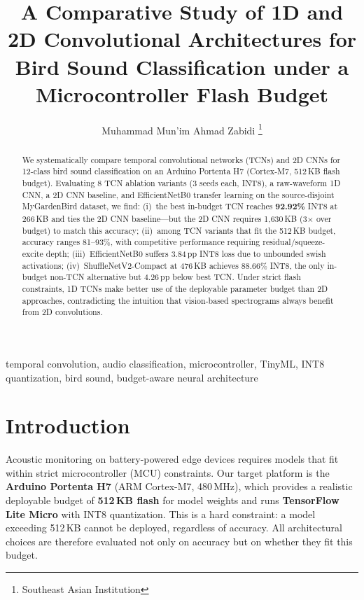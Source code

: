 \documentclass[conference]{IEEEtran}
\begin{document}
\title{A Comparative Study of 1D and 2D Convolutional Architectures for Bird Sound Classification under a Microcontroller Flash Budget}

\author{Muhammad Mun'im Ahmad Zabidi%
\thanks{Southeast Asian Institution}}

\maketitle

\begin{abstract}
We systematically compare temporal convolutional networks (TCNs) and 2D CNNs for 12-class bird sound classification on an Arduino Portenta H7 (Cortex-M7, 512\,KB flash budget). Evaluating 8 TCN ablation variants (3 seeds each, INT8), a raw-waveform 1D CNN, a 2D CNN baseline, and EfficientNetB0 transfer learning on the source-disjoint MyGardenBird dataset, we find: (i)~the best in-budget TCN reaches \textbf{92.92\%} INT8 at 266\,KB and ties the 2D CNN baseline---but the 2D CNN requires 1{,}630\,KB (3$\times$ over budget) to match this accuracy; (ii)~among TCN variants that fit the 512\,KB budget, accuracy ranges 81--93\%, with competitive performance requiring residual/squeeze-excite depth; (iii)~EfficientNetB0 suffers 3.84\,pp INT8 loss due to unbounded swish activations; (iv)~ShuffleNetV2-Compact at 476\,KB achieves 88.66\% INT8, the only in-budget non-TCN alternative but 4.26\,pp below best TCN. Under strict flash constraints, 1D TCNs make better use of the deployable parameter budget than 2D approaches, contradicting the intuition that vision-based spectrograms always benefit from 2D convolutions.
\end{abstract}

\begin{IEEEkeywords}
temporal convolution, audio classification, microcontroller, TinyML, INT8 quantization, bird sound, budget-aware neural architecture
\end{IEEEkeywords}

\IEEEpeerreviewmaketitle


\section{Introduction}

Acoustic monitoring on battery-powered edge devices requires models that fit within strict microcontroller (MCU) constraints. Our target platform is the \textbf{Arduino Portenta H7} (ARM Cortex-M7, 480\,MHz), which provides a realistic deployable budget of \textbf{512\,KB flash} for model weights and runs \textbf{TensorFlow Lite Micro} with INT8 quantization. This is a hard constraint: a model exceeding 512\,KB cannot be deployed, regardless of accuracy. All architectural choices are therefore evaluated not only on accuracy but on whether they fit this budget.
\end{document}
